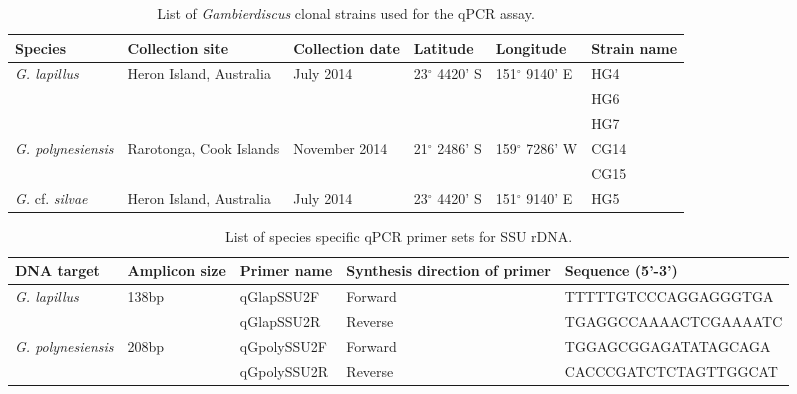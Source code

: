 \documentclass[12pt]{article}
\begin{document}
\FloatBarrier
\begin{table}
\caption{List of \emph{Gambierdiscus} clonal strains used for the qPCR assay.}
\label{tbl:StrainTable}
\begin{tabular}{ | p{2cm} | p{2cm} | p{2cm}| p{3cm} | p{3cm} | p{2cm} | }
\hline
\textbf{Species} & \textbf{Collection site} & \textbf{Collection date} &\textbf{Latitude} & \textbf{Longitude} & \textbf{Strain name} \\
\hline
\emph{G. lapillus} &Heron Island, Australia &July 2014 &23$^{\circ}$ 4420' S&151$^{\circ}$ 9140' E & HG4 \\
\hline
&&&&& HG6\\
\hline
&&&& &HG7\\
\hline
\emph{G. polynesiensis}&Rarotonga, Cook Islands&November 2014 &21$^{\circ}$ 2486' S&159$^{\circ}$ 7286' W & CG14 \\
\hline
&&&&&CG15\\
\hline
\emph{G.} cf. \emph{silvae}&Heron Island, Australia &July 2014 &23$^{\circ}$ 4420' S&151$^{\circ}$ 9140' E& HG5\\
\hline
\end{tabular}
\end{table}
\FloatBarrier
\begin{table}
\caption{List of species specific qPCR primer sets for SSU rDNA.}
\label{tbl:PrimerTable}
\begin{tabular}{ | p{2.5cm} | p{2cm} | p{2.5cm} | p{2cm} | p{5cm} | }
\hline
\textbf{DNA target} & \textbf{Amplicon size} & \textbf{Primer name} & \textbf{Synthesis direction of primer} & \textbf{Sequence (5'-3')} \\
\hline
\emph{G. lapillus}&138bp&qGlapSSU2F&Forward&TTTTTGTCCCAGGAGGGTGA\\
\hline
& &qGlapSSU2R&Reverse&TGAGGCCAAAACTCGAAAATC\\
\hline
\emph{G. polynesiensis}&208bp&qGpolySSU2F&Forward&TGGAGCGGAGATATAGCAGA\\
\hline
& &qGpolySSU2R&Reverse&CACCCGATCTCTAGTTGGCAT\\
\hline
\end{tabular}
\end{table}
\FloatBarrier
\end{document}
